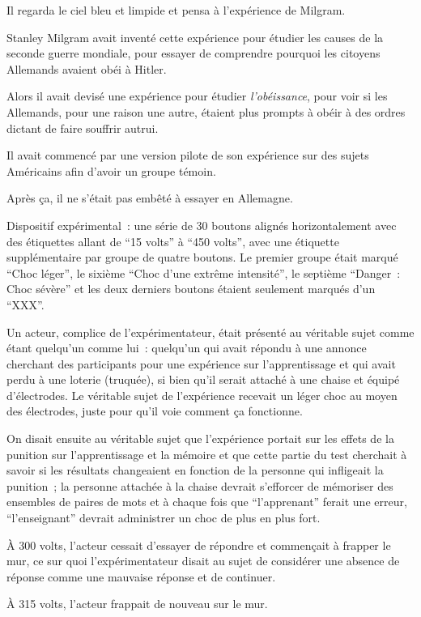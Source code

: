 Il regarda le ciel bleu et limpide et pensa à l'expérience de Milgram.

Stanley Milgram avait inventé cette expérience pour étudier les causes de la seconde guerre mondiale, pour essayer de comprendre pourquoi les citoyens Allemands avaient obéi à Hitler.

Alors il avait devisé une expérience pour étudier \emph{l'obéissance}, pour voir si les Allemands, pour une raison une autre, étaient plus prompts à obéir à des ordres dictant de faire souffrir autrui.

Il avait commencé par une version pilote de son expérience sur des sujets Américains afin d'avoir un groupe témoin.

Après ça, il ne s'était pas embêté à essayer en Allemagne.

Dispositif expérimental~: une série de 30 boutons alignés horizontalement avec des étiquettes allant de “15 volts” à “450 volts”, avec une étiquette supplémentaire par groupe de quatre boutons.
Le premier groupe était marqué “Choc léger”, le sixième “Choc d'une extrême intensité”, le septième “Danger~: Choc sévère” et les deux derniers boutons étaient seulement marqués d'un “XXX”.

Un acteur, complice de l'expérimentateur, était présenté au véritable sujet comme étant quelqu'un comme lui~: quelqu'un qui avait répondu à une annonce cherchant des participants pour une expérience sur l'apprentissage et qui avait perdu à une loterie (truquée), si bien qu'il serait attaché à une chaise et équipé d'électrodes.
Le véritable sujet de l'expérience recevait un léger choc au moyen des électrodes, juste pour qu'il voie comment ça fonctionne.

On disait ensuite au véritable sujet que l'expérience portait sur les effets de la punition sur l'apprentissage et la mémoire et que cette partie du test cherchait à savoir si les résultats changeaient en fonction de la personne qui infligeait la punition~; la personne attachée à la chaise devrait s'efforcer de mémoriser des ensembles de paires de mots et à chaque fois que “l'apprenant” ferait une erreur, “l'enseignant” devrait administrer un choc de plus en plus fort.

À 300 volts, l'acteur cessait d'essayer de répondre et commençait à frapper le mur, ce sur quoi l'expérimentateur disait au sujet de considérer une absence de réponse comme une mauvaise réponse et de continuer.

À 315 volts, l'acteur frappait de nouveau sur le mur.


